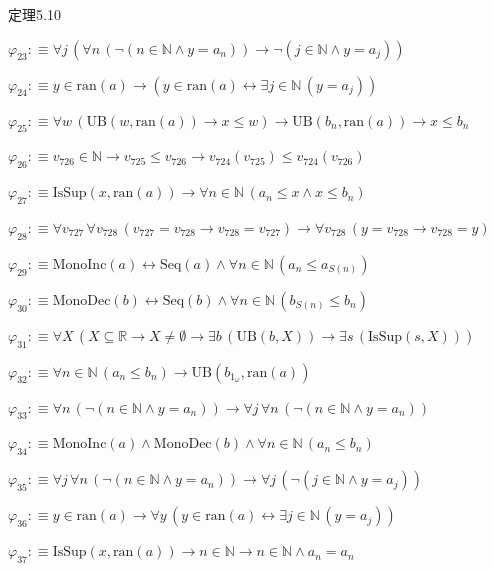 \begin{fullproof}{定理5.10}
\begin{abbrevlist}
\item $\varphi_{23} :\equiv \forall j\,(\forall n\,(\neg (n \in \mathbb{N} \land y = a_{n})) \to \neg (j \in \mathbb{N} \land y = a_{j}))$
\item $\varphi_{24} :\equiv y \in \mathrm{ran}(a) \to (y \in \mathrm{ran}(a) \leftrightarrow \exists j \in \mathbb{N}\,(y = a_{j}))$
\item $\varphi_{25} :\equiv \forall w\,(\mathrm{UB}(w,\mathrm{ran}(a)) \to x \leq w) \to \mathrm{UB}(b_{n},\mathrm{ran}(a)) \to x \leq b_{n}$
\item $\varphi_{26} :\equiv v_{726} \in \mathbb{N} \to v_{725} \leq v_{726} \to v_{724}(v_{725}) \leq v_{724}(v_{726})$
\item $\varphi_{27} :\equiv \mathrm{IsSup}(x,\mathrm{ran}(a)) \to \forall n \in \mathbb{N}\,(a_{n} \leq x \land x \leq b_{n})$
\item $\varphi_{28} :\equiv \forall v_{727}\,\forall v_{728}\,(v_{727} = v_{728} \to v_{728} = v_{727}) \to \forall v_{728}\,(y = v_{728} \to v_{728} = y)$
\item $\varphi_{29} :\equiv \mathrm{MonoInc}(a) \leftrightarrow \mathrm{Seq}(a) \land \forall n \in \mathbb{N}\,(a_{n} \leq a_{S(n)})$
\item $\varphi_{30} :\equiv \mathrm{MonoDec}(b) \leftrightarrow \mathrm{Seq}(b) \land \forall n \in \mathbb{N}\,(b_{S(n)} \leq b_{n})$
\item $\varphi_{31} :\equiv \forall X\,(X \subseteq \mathbb{R} \to X \neq \emptyset \to \exists b\,(\mathrm{UB}(b,X)) \to \exists s\,(\mathrm{IsSup}(s,X)))$
\item $\varphi_{32} :\equiv \forall n \in \mathbb{N}\,(a_{n} \leq b_{n}) \to \mathrm{UB}(b_{1_{\omega}},\mathrm{ran}(a))$
\item $\varphi_{33} :\equiv \forall n\,(\neg (n \in \mathbb{N} \land y = a_{n})) \to \forall j\,\forall n\,(\neg (n \in \mathbb{N} \land y = a_{n}))$
\item $\varphi_{34} :\equiv \mathrm{MonoInc}(a) \land \mathrm{MonoDec}(b) \land \forall n \in \mathbb{N}\,(a_{n} \leq b_{n})$
\item $\varphi_{35} :\equiv \forall j\,\forall n\,(\neg (n \in \mathbb{N} \land y = a_{n})) \to \forall j\,(\neg (j \in \mathbb{N} \land y = a_{j}))$
\item $\varphi_{36} :\equiv y \in \mathrm{ran}(a) \to \forall y\,(y \in \mathrm{ran}(a) \leftrightarrow \exists j \in \mathbb{N}\,(y = a_{j}))$
\item $\varphi_{37} :\equiv \mathrm{IsSup}(x,\mathrm{ran}(a)) \to n \in \mathbb{N} \to n \in \mathbb{N} \land a_{n} = a_{n}$

\end{abbrevlist}
\end{fullproof}
